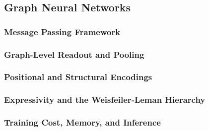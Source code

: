 \subsection{Graph Neural Networks}
\label{sec:prelim:gnn}

\subsubsection{Message Passing Framework}
\label{sec:prelim:gnn:mp}

\subsubsection{Graph-Level Readout and Pooling}
\label{sec:prelim:gnn:readout}

\subsubsection{Positional and Structural Encodings}
\label{sec:prelim:gnn:pe}

\subsubsection{Expressivity and the Weisfeiler-Leman Hierarchy}
\label{sec:prelim:gnn:expressivity}

\subsubsection{Training Cost, Memory, and Inference}
\label{sec:prelim:gnn:cost}
